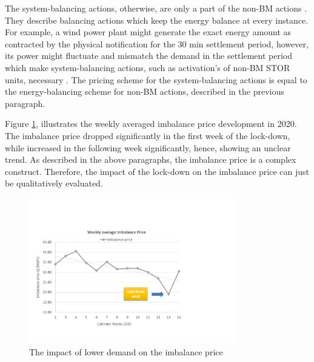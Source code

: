 \documentclass[energies,article,submit,moreauthors,pdftex]{Definitions/mdpi}
\begin{document}
The system-balancing actions, otherwise, are only a part of the non-BM actions \cite{Nationalgrid2018BalancingStatement}. They describe balancing actions which keep the energy balance at every instance. For example, a wind power plant might generate the exact energy amount as contracted by the physical notification for the 30 min settlement period, however, its power might fluctuate and mismatch the demand in the settlement period which make system-balancing actions, such as activation's of non-BM STOR units, necessary \cite{Nationalgrid2018BalancingStatement}. The pricing scheme for the system-balancing actions is equal to the energy-balancing scheme for non-BM actions, described in the previous paragraph.  

Figure \ref{fig:imbalance-price-development}, illustrates the weekly averaged imbalance price development in 2020. The imbalance price dropped significantly in the first week of the lock-down, while increased in the following week significantly, hence, showing an unclear trend. As described in the above paragraphs, the imbalance price is a complex construct. Therefore, the impact of the lock-down on the imbalance price can just be qualitatively evaluated.

\begin{figure}[H]
\centering
\hspace{-25pt}
\includegraphics[trim={0cm 2cm 7cm 4.5cm},clip,width=0.8\textwidth]{Graphics/Imbalance-price-development-2020.pdf}
\caption{The impact of lower demand on the imbalance price}
\label{fig:imbalance-price-development}
\end{figure} 
\end{document}
